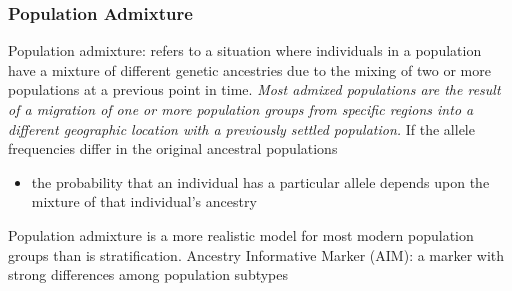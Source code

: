 \documentclass[a4paper,twoside,11pt]{article}
\begin{document}
\subsubsection{Population Admixture}
\textcolor{NavyBlue}{Population admixture: }refers to a situation where individuals in a population have a mixture of different genetic ancestries due to the mixing of two or more populations at a previous point in time.
\newline
\newline
\textcolor{NavyBlue}{\textit{Most admixed populations are the result of a migration of one or more population groups from specific regions into a different geographic location with a previously settled population.}}
\newline
If the allele frequencies differ in the original ancestral populations
\begin{itemize}
    \item the probability that an individual has a particular allele depends upon the mixture of that individual’s ancestry
\end{itemize}
Population admixture is a more realistic model for most modern population groups than is stratification. 
\newline
\newline
\textcolor{NavyBlue}{Ancestry Informative Marker (AIM)}: a marker with strong differences among population subtypes
\end{document}
